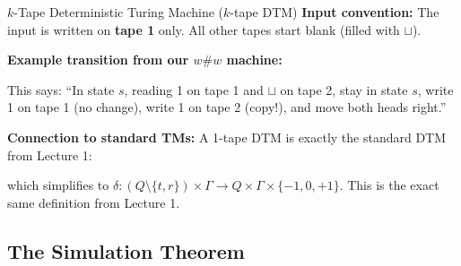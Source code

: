 \begin{definitionbox}{$k$-Tape Deterministic Turing Machine ($k$-tape DTM)}
\textbf{Input convention:} The input is written on \textbf{tape 1} only. All other tapes start blank (filled with $\sqcup$).

\textbf{Example transition from our $w\#w$ machine:}


This says: ``In state $s$, reading 1 on tape 1 and $\sqcup$ on tape 2, stay in state $s$, write 1 on tape 1 (no change), write 1 on tape 2 (copy!), and move both heads right.''

\textbf{Connection to standard TMs:} A 1-tape DTM is exactly the standard DTM from Lecture 1:


which simplifies to $\delta \colon (Q \setminus \{t,r\}) \times \Gamma \longrightarrow Q \times \Gamma \times \{-1, 0, +1\}$. This is the exact same definition from Lecture 1.

\end{definitionbox}


\subsection{The Simulation Theorem}

